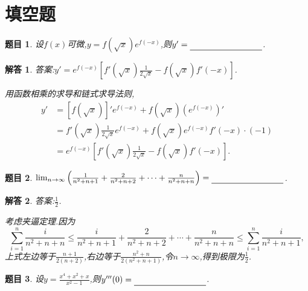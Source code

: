 \documentclass[a4paper,oneside,12pt]{ctexart}
\theoremstyle{plain}
\newtheorem{task}{题目}[section]
\theoremstyle{nonumberplain}
\newtheorem{solution}{解答}
\theoremstyle{nonumberplain}
\theoremstyle{nonumberplain}
\theoremstyle{nonumberbreak}
\newcommand{\blank}{\rule[-4pt]{3cm}{0.5pt}}
\begin{document}
    \section{填空题}

    \begin{task}
        \label{ts:2.1}
        设$f(x)$可微,$y=f(\sqrt{x})e^{f(-x)}$,则$y'=\blank$.
    \end{task}

    \begin{solution}
        答案:$y'=e^{f(-x)}\left[f'(\sqrt{x})\frac{1}{2\sqrt{x}}-f(\sqrt{x})f'(-x)\right]$.

        用函数相乘的求导和链式求导法则,
        \begin{align*}
            y'&=[f(\sqrt{x})]'e^{f(-x)}+f(\sqrt{x})(e^{f(-x)})'\\
            &=f'(\sqrt{x})\frac{1}{2\sqrt{x}}e^{f(-x)}+f(\sqrt{x})e^{f(-x)}f'(-x)\cdot(-1)\\
            &=e^{f(-x)}\left[f'(\sqrt{x})\frac{1}{2\sqrt{x}}-f(\sqrt{x})f'(-x)\right].
        \end{align*}
    \end{solution}

    \begin{task}
        \label{ts:2.2}
        $\lim_{n\to\infty}\left(\frac{1}{n^2+n+1}+\frac{2}{n^2+n+2}+\cdots+\frac{n}{n^2+n+n}\right)=\blank$.
    \end{task}

    \begin{solution}
        答案:$\frac{1}{2}$.
        
        考虑夹逼定理.因为 
        \begin{equation*}
            \sum_{i=1}^n\frac{i}{n^2+n+n}\leqslant \frac{i}{n^2+n+1}+\frac{2}{n^2+n+2}+\cdots+\frac{n}{n^2+n+n}\leqslant\sum_{i=1}^n\frac{i}{n^2+n+1},
        \end{equation*}
        上式左边等于$\frac{n+1}{2(n+2)}$,右边等于$\frac{n^2+n}{2(n^2+n+1)}$,令$n\to\infty$,得到极限为$\frac{1}{2}$.
    \end{solution}

    \begin{task}
        \label{ts:2.3}
        设$y=\frac{x^4+x^2+x}{x^2-1}$,则$y'''(0)=\blank$.
    \end{task}
\end{document}
